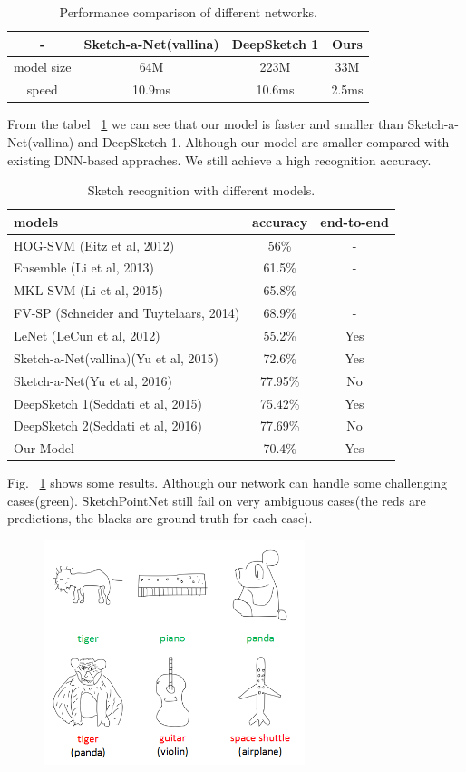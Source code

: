 \begin{table}[htbp]
\centering
\begin{tabular}{cccc}
    \hline
     -&Sketch-a-Net(vallina)& DeepSketch 1& Ours\\
    \hline
     model size& 64M&223M& 33M\\
     speed &10.9ms&10.6ms& 2.5ms\\
    \hline
\end{tabular}
\caption{Performance comparison of different networks.}
\label{tbl:speed}
\end{table}
From the tabel ~\ref{tbl:speed} we can see that our model is faster and smaller than Sketch-a-Net(vallina) and DeepSketch 1. Although our model are smaller compared with existing DNN-based appraches. We still achieve a high recognition accuracy.

\begin{table}[htbp]
\centering
\small
\begin{tabular}{lcc}
    \hline
     models &accuracy &end-to-end \\
    \hline
     HOG-SVM (Eitz et al, 2012)& 56\% &-\\
     Ensemble (Li et al, 2013) &61.5\% &-\\
     MKL-SVM (Li et al, 2015) & 65.8\% &-\\
     FV-SP (Schneider and Tuytelaars, 2014) & 68.9\% &-\\
     LeNet (LeCun et al, 2012)& 55.2\% &Yes\\
     Sketch-a-Net(vallina)(Yu et al, 2015)& 72.6\% &Yes\\
     Sketch-a-Net(Yu et al, 2016)& 77.95\% &No\\
     DeepSketch 1(Seddati et al, 2015)& 75.42\% &Yes\\
     DeepSketch 2(Seddati et al, 2016)& 77.69\% &No\\
     Our Model& 70.4\% &Yes\\
    \hline
\end{tabular}
\caption{Sketch recognition with different models.}
\label{tbl:acc}
\end{table}

Fig. ~\ref{fig:resshow} shows some results. Although our network can handle some challenging cases(green). SketchPointNet still fail on very ambiguous cases(the reds are predictions, the blacks are ground truth for each case).

\begin{figure}[htbp]
    \center
    \includegraphics[width=3in]{images/res.png}
    \label{fig:resshow}
\end{figure}